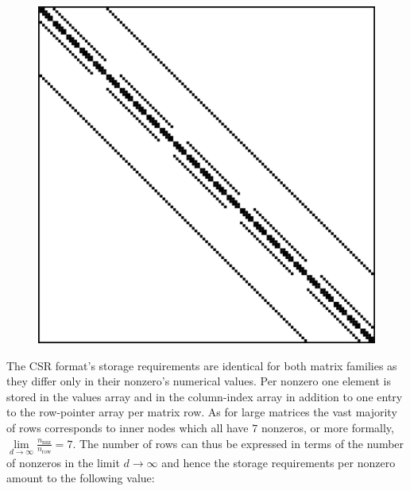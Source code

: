     \begin{figure}[H]
        \centering
        \begin{minipage}{0.45\textwidth}
          \centering
          
        \end{minipage}\hfill
        \begin{minipage}{0.45\textwidth}
          \centering
          \includegraphics[width=1.0\textwidth]{fig/laplacian_example.png} %
        \end{minipage}
        \label{fig:laplacian-example-reprint}
    \end{figure}

    The CSR format's storage requirements are identical for both matrix families as they differ only in their nonzero's
    numerical values. Per nonzero one element is stored in the values array and in the column-index array in addition to
    one entry to the row-pointer array per matrix row. As for large matrices the vast majority of rows corresponds to
    inner nodes which all have $7$ nonzeros, or more formally, $\lim \limits_{d\rightarrow \infty}
    \frac{n_{\text{nnz}}}{n_{\text{row}}} = 7$. The number of rows can thus be expressed in terms of the number of
    nonzeros in the limit $d \rightarrow \infty$ and hence the storage requirements per nonzero amount to the following
    value:

